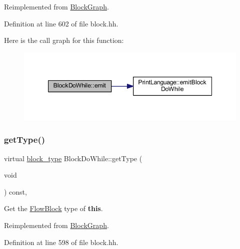 Reimplemented from \mbox{\hyperlink{class_block_graph_a535d3c7cb13e5e45b6e121b024fa339f}{Block\+Graph}}.



Definition at line 602 of file block.\+hh.

Here is the call graph for this function\+:
\nopagebreak
\begin{figure}[H]
\begin{center}
\leavevmode
\includegraphics[width=347pt]{class_block_do_while_aa3ab4da82b72f8de35ad9de5f5dff9a2_cgraph}
\end{center}
\end{figure}
\mbox{\label{class_block_do_while_a3700fcac8afffc121249a49af054269e}} 
\subsubsection{\texorpdfstring{getType()}{getType()}}
{\footnotesize\ttfamily virtual \mbox{\hyperlink{class_flow_block_a70df78390870fcdd51e31426ba6a193e}{block\+\_\+type}} Block\+Do\+While\+::get\+Type (\begin{DoxyParamCaption}\item[{void}]{ }\end{DoxyParamCaption}) const\hspace{0.3cm}{\ttfamily [inline]}, {\ttfamily [virtual]}}



Get the \mbox{\hyperlink{class_flow_block}{Flow\+Block}} type of {\bfseries{this}}. 



Reimplemented from \mbox{\hyperlink{class_block_graph_a8e542e109e0acc977218ceaf3c248153}{Block\+Graph}}.



Definition at line 598 of file block.\+hh.

\mbox{\label{class_block_do_while_ab391ccd9276eec9200396ea6e8db7a96}} 
